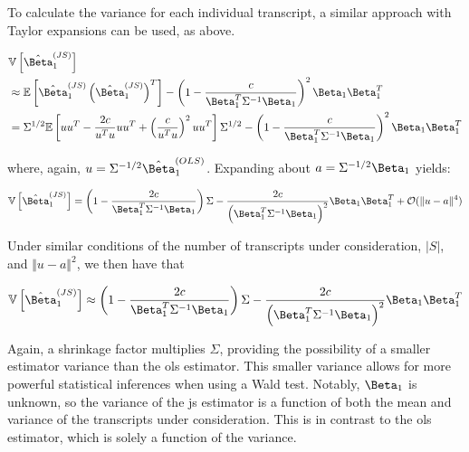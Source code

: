 To calculate the variance for each individual transcript, a similar approach with Taylor expansions can be used, as above.

\begin{align*}
  &\mathbb{V} \left[ \hat{\Beta}_1^{(JS)} \right] \\
  &\approx \mathbb{E} \left[ \hat{\Beta}_1^{(JS)}
    \left( \hat{\Beta}_1^{(JS)} \right)^T \right]
    - \left(1 - \frac{c}{\Beta_1^T \Sigma^{-1} \Beta_1} \right)^2 \Beta_1 \Beta_1^T \\
  &= \Sigma^{1/2} \mathbb{E} \left[ u u^T - \frac{2c}{u^Tu}uu^T + \left( \frac{c}{u^Tu} \right)^2 uu^T \right]\Sigma^{1/2}
    - \left(1 - \frac{c}{\Beta_1^T \Sigma^{-1} \Beta_1} \right)^2 \Beta_1 \Beta_1^T \\
\end{align*}

where, again, $u = \Sigma^{-1/2} \hat{\Beta}_1^{(OLS)}$.
Expanding about $a = \Sigma^{-1/2} \Beta_1$ yields:

\begin{equation*}
  \mathbb{V} \left [ \hat{\Beta}_1^{(JS)} \right]
  = \left(1 - \frac{2c}{\Beta_1^T \Sigma^{-1} \Beta_1} \right) \Sigma
    - \frac{2c}{\left( \Beta_1^T \Sigma^{-1} \Beta_1 \right)^2} \Beta_1 \Beta_1^T
    + \mathcal{O}(\Vert u - a \Vert ^4)
\end{equation*}

Under similar conditions of the number of transcripts under consideration, $|S|$, and $\Vert u - a \Vert ^2$, we then have that

\begin{equation}
  \mathbb{V} \left [ \hat{\Beta}_1^{(JS)} \right]
  \approx \left(1 - \frac{2c}{\Beta_1^T \Sigma^{-1} \Beta_1} \right) \Sigma
  - \frac{2c}{\left( \Beta_1^T \Sigma^{-1} \Beta_1 \right)^2} \Beta_1 \Beta_1^T
\end{equation}

Again, a shrinkage factor multiplies $\Sigma$, providing the possibility of a smaller estimator variance than the \gls{ols} estimator.
This smaller variance allows for more powerful statistical inferences when using a Wald test.
Notably, $\Beta_1$ is unknown, so the variance of the \gls{js} estimator is a function of both the mean and variance of the transcripts under consideration.
This is in contrast to the \gls{ols} estimator, which is solely a function of the variance.
